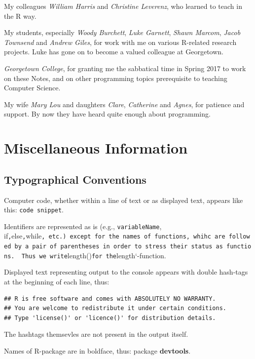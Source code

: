 \documentclass[]{book}
\theoremstyle{definition}
\theoremstyle{definition}
\theoremstyle{remark}
\begin{document}
My colleagues \emph{William Harris} and \emph{Christine Leverenz}, who
learned to teach in the R way.

My students, especially \emph{Woody Burchett}, \emph{Luke Garnett},
\emph{Shawn Marcom}, \emph{Jacob Townsend} and \emph{Andrew Giles}, for
work with me on various R-related research projects. Luke has gone on to
become a valued colleague at Georgetown.

\emph{Georgetown College}, for granting me the sabbatical time in Spring
2017 to work on these Notes, and on other programming topics
prerequisite to teaching Computer Science.

My wife \emph{Mary Lou} and daughters \emph{Clare}, \emph{Catherine} and
\emph{Agnes}, for patience and support. By now they have heard quite
enough about programming.

\section{Miscellaneous Information}\label{miscellaneous-information}

\subsection{Typographical Conventions}\label{typographical-conventions}

Computer code, whether within a line of text or as displayed text,
appears like this: \texttt{code\ snippet}.

Identifiers are represented as is (e.g., \texttt{variableName},
if\texttt{,}else\texttt{,}while\texttt{,\ etc.)\ except\ for\ the\ names\ of\ functions,\ whihc\ are\ followed\ by\ a\ pair\ of\ parentheses\ in\ order\ to\ stress\ their\ status\ as\ functions.\ \ Thus\ we\ write}length()\texttt{for\ the}length`-function.

Displayed text representing output to the console appears with double
hash-tags at the beginning of each line, thus:

\begin{verbatim}
## R is free software and comes with ABSOLUTELY NO WARRANTY.
## You are welcome to redistribute it under certain conditions.
## Type 'license()' or 'licence()' for distribution details.
\end{verbatim}

The hashtags themsevles are not present in the output itself.

Names of R-package are in boldface, thus: package \textbf{devtools}.
\end{document}
